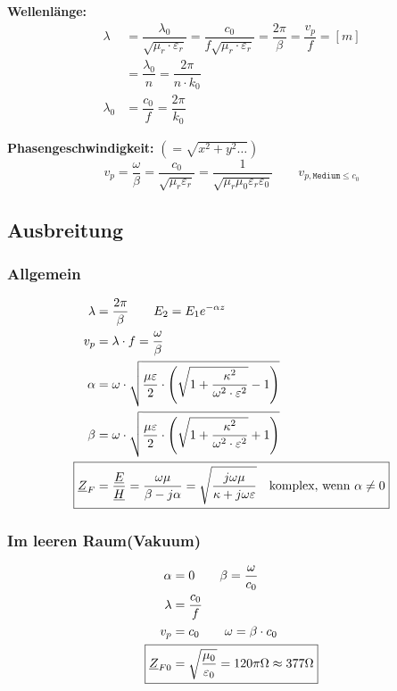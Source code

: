 \textbf{Wellenlänge:}
\begin{align*}
    \lambda   & = \dfrac{\lambda_0}{\sqrt{\mu_r \cdot \varepsilon_r}} = \dfrac{c_0}{f \sqrt{\mu_r \cdot \varepsilon_r}} = \dfrac{2 \pi}{\beta} = \dfrac{v_p}{f} = [m] \\
              & = \dfrac{\lambda_0}{n} = \dfrac{2 \pi}{n \cdot k_0}                                             \\
    \lambda_0 & = \dfrac{c_0}{f} = \dfrac{2\pi}{k_0}
\end{align*}

\textbf{Phasengeschwindigkeit:}
$\left(= \sqrt{x^2 + y^2 \dots} \right)$
\[
    v_p = \dfrac{\omega}{\beta} = \frac{c_0}{\sqrt{ \mu_r \varepsilon_r }}  = \frac{1}{\sqrt{ \mu_r \mu_0 \varepsilon_r \varepsilon_0}} \qquad v_{p,\texttt{Medium} \leq c_0}
\]


\subsection{Ausbreitung}
\subsubsection{Allgemein}
\begin{align*}
    \lambda                 & = \dfrac{2\pi}{\beta}         \qquad E_2 = E_1 e^{-\alpha z}                                                                                        \\
    v_p                     & = \lambda\cdot f = \dfrac{\omega}{\beta}                                                                                                    \\
    \alpha                  & = \omega \cdot \sqrt{\dfrac{\mu \varepsilon}{2}\cdot \left(\sqrt{1+\dfrac{\kappa^2}{\omega^2\cdot\varepsilon^2}} - 1\right)}   \\
    \beta                   & = \omega \cdot \sqrt{\dfrac{\mu \varepsilon}{2}\cdot \left(\sqrt{1+\dfrac{\kappa^2}{\omega^2\cdot\varepsilon^2}} + 1\right)} \\
    \Aboxed{\underline{Z}_F & = \dfrac{\underline{E}}{\underline{H}} = \dfrac{\omega \mu}{\beta - j \alpha} = \sqrt{\dfrac{j\omega\mu}{\kappa+j\omega\varepsilon}} \quad\text{komplex, wenn } \alpha \neq 0} 
\end{align*}

\subsubsection{Im leeren Raum(Vakuum)}
\begin{align*}
    \alpha                     & = 0  \qquad \beta = \dfrac{\omega}{c_0}                                                  \\
    \lambda                    & = \dfrac{c_0}{f}                                                       \\
    v_p                        & = c_0        \qquad  \omega = \beta \cdot c_0                                \\
    \Aboxed{\underline{Z}_{F0} & = \sqrt{\dfrac{\mu_0}{\varepsilon_0}} = 120 \pi\Omega\approx377\Omega}
\end{align*}

